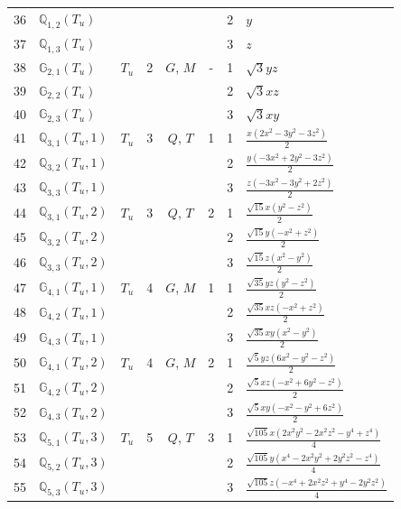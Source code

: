 \documentclass[fleqn,10pt,landscape]{jsarticle}
\begin{document}
\begin{longtable}[l]{clcccccl}
36 & $\mathbb{Q}_{1,2}(T_{u})$ &  &  &  &  & 2 & $y$ \\
37 & $\mathbb{Q}_{1,3}(T_{u})$ &  &  &  &  & 3 & $z$ \\ \hline
38 & $\mathbb{G}_{2,1}(T_{u})$ & $T_{u}$ & 2 & $G$, $M$ & - & 1 & $\sqrt{3} y z$ \\
39 & $\mathbb{G}_{2,2}(T_{u})$ &  &  &  &  & 2 & $\sqrt{3} x z$ \\
40 & $\mathbb{G}_{2,3}(T_{u})$ &  &  &  &  & 3 & $\sqrt{3} x y$ \\ \hline
41 & $\mathbb{Q}_{3,1}(T_{u},1)$ & $T_{u}$ & 3 & $Q$, $T$ & 1 & 1 & $\frac{x \left(2 x^{2} - 3 y^{2} - 3 z^{2}\right)}{2}$ \\
42 & $\mathbb{Q}_{3,2}(T_{u},1)$ &  &  &  &  & 2 & $\frac{y \left(- 3 x^{2} + 2 y^{2} - 3 z^{2}\right)}{2}$ \\
43 & $\mathbb{Q}_{3,3}(T_{u},1)$ &  &  &  &  & 3 & $\frac{z \left(- 3 x^{2} - 3 y^{2} + 2 z^{2}\right)}{2}$ \\ \hline
44 & $\mathbb{Q}_{3,1}(T_{u},2)$ & $T_{u}$ & 3 & $Q$, $T$ & 2 & 1 & $\frac{\sqrt{15} x \left(y^{2} - z^{2}\right)}{2}$ \\
45 & $\mathbb{Q}_{3,2}(T_{u},2)$ &  &  &  &  & 2 & $\frac{\sqrt{15} y \left(- x^{2} + z^{2}\right)}{2}$ \\
46 & $\mathbb{Q}_{3,3}(T_{u},2)$ &  &  &  &  & 3 & $\frac{\sqrt{15} z \left(x^{2} - y^{2}\right)}{2}$ \\ \hline
47 & $\mathbb{G}_{4,1}(T_{u},1)$ & $T_{u}$ & 4 & $G$, $M$ & 1 & 1 & $\frac{\sqrt{35} y z \left(y^{2} - z^{2}\right)}{2}$ \\
48 & $\mathbb{G}_{4,2}(T_{u},1)$ &  &  &  &  & 2 & $\frac{\sqrt{35} x z \left(- x^{2} + z^{2}\right)}{2}$ \\
49 & $\mathbb{G}_{4,3}(T_{u},1)$ &  &  &  &  & 3 & $\frac{\sqrt{35} x y \left(x^{2} - y^{2}\right)}{2}$ \\ \hline
50 & $\mathbb{G}_{4,1}(T_{u},2)$ & $T_{u}$ & 4 & $G$, $M$ & 2 & 1 & $\frac{\sqrt{5} y z \left(6 x^{2} - y^{2} - z^{2}\right)}{2}$ \\
51 & $\mathbb{G}_{4,2}(T_{u},2)$ &  &  &  &  & 2 & $\frac{\sqrt{5} x z \left(- x^{2} + 6 y^{2} - z^{2}\right)}{2}$ \\
52 & $\mathbb{G}_{4,3}(T_{u},2)$ &  &  &  &  & 3 & $\frac{\sqrt{5} x y \left(- x^{2} - y^{2} + 6 z^{2}\right)}{2}$ \\ \hline
53 & $\mathbb{Q}_{5,1}(T_{u},3)$ & $T_{u}$ & 5 & $Q$, $T$ & 3 & 1 & $\frac{\sqrt{105} x \left(2 x^{2} y^{2} - 2 x^{2} z^{2} - y^{4} + z^{4}\right)}{4}$ \\
54 & $\mathbb{Q}_{5,2}(T_{u},3)$ &  &  &  &  & 2 & $\frac{\sqrt{105} y \left(x^{4} - 2 x^{2} y^{2} + 2 y^{2} z^{2} - z^{4}\right)}{4}$ \\
55 & $\mathbb{Q}_{5,3}(T_{u},3)$ &  &  &  &  & 3 & $\frac{\sqrt{105} z \left(- x^{4} + 2 x^{2} z^{2} + y^{4} - 2 y^{2} z^{2}\right)}{4}$ \\
\end{longtable}
\end{document}
